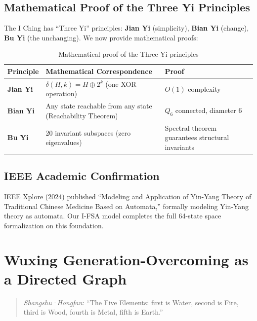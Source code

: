 \documentclass[conference]{IEEEtran}
\theoremstyle{remark}
\begin{document}
\subsection{Mathematical Proof of the Three Yi Principles}

The I Ching has ``Three Yi'' principles: \textbf{Jian Yi} (simplicity), \textbf{Bian Yi} (change), \textbf{Bu Yi} (the unchanging). We now provide mathematical proofs:

\begin{table}[h]
\centering
\caption{Mathematical proof of the Three Yi principles}
\label{tab:threeyi}
\begin{tabular}{p{2cm}p{4.5cm}p{1.5cm}}
\toprule
Principle & Mathematical Correspondence & Proof \\
\midrule
\textbf{Jian Yi} & $\delta(H,k)=H\oplus 2^k$ (one XOR operation) & $O(1)$ complexity \\
\textbf{Bian Yi} & Any state reachable from any state (Reachability Theorem) & $Q_6$ connected, diameter 6 \\
\textbf{Bu Yi} & 20 invariant subspaces (zero eigenvalues) & Spectral theorem guarantees structural invariants \\
\bottomrule
\end{tabular}
\end{table}

\subsection{IEEE Academic Confirmation}

IEEE Xplore (2024) published ``Modeling and Application of Yin-Yang Theory of Traditional Chinese Medicine Based on Automata,'' formally modeling Yin-Yang theory as automata. Our I-FSA model completes the full 64-state space formalization on this foundation.

\section{Wuxing Generation-Overcoming as a Directed Graph}

\begin{quote}
\emph{Shangshu·Hongfan}: ``The Five Elements: first is Water, second is Fire, third is Wood, fourth is Metal, fifth is Earth.''
\end{quote}
\end{document}
